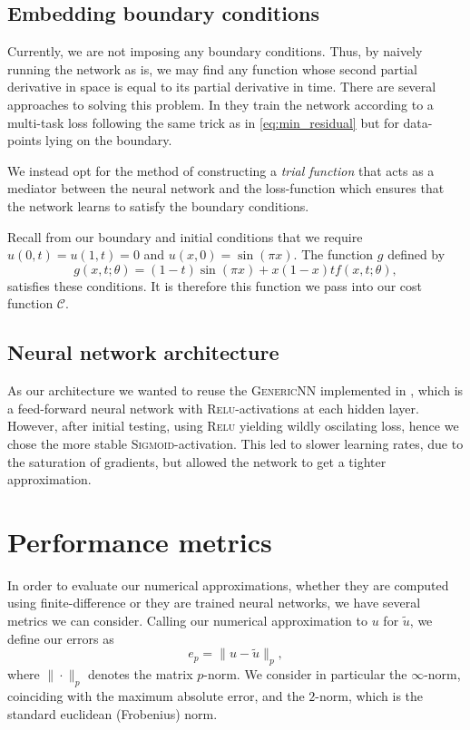 \documentclass[article, a4paper, oneside]{memoir}
\newcommand{\cost}{\mathcal{C}}
\begin{document}
	\subsection{Embedding boundary conditions}

	Currently, we are not imposing any boundary conditions. Thus, by
	naively running the network as is, we may find any function whose
	second partial derivative in space is equal to its partial derivative
	in time. There are several approaches to solving this problem. In
	\cite{luDeepXDEDeepLearning2019} they train the network according to a
	multi-task loss following the same trick as in \cref{eq:min_residual}
	but for data-points lying on the boundary.
	
	We instead opt for the method of constructing a \emph{trial function}
	that acts as a mediator between the neural network and the
	loss-function which ensures that the network learns to satisfy the
	boundary conditions.

	Recall from our boundary and initial conditions that we require \( u(0,
	t) = u(1, t) = 0 \) and \( u(x, 0) = \sin(\pi x) \). The function \( g
	\) defined by
	\begin{equation}
		\label{eq:trial}
		g(x, t; \theta) = (1 - t) \sin(\pi x) + x(1-x)t f(x, t; \theta),
	\end{equation}
	satisfies these conditions. It is therefore this function we pass into
	our cost function \( \cost \).
	
	\subsection{Neural network architecture}

	As our architecture we wanted to reuse the \textsc{GenericNN}
	implemented in \cite{stangebyFYSSTK4155Project2019a}, which is a
	feed-forward neural network with \textsc{Relu}-activations at each
	hidden layer. However, after initial testing, using \textsc{Relu}
	yielding wildly oscilating loss, hence we chose the more stable
	\textsc{Sigmoid}-activation. This led to slower learning rates, due to
	the saturation of gradients, but allowed the network to get a tighter
	approximation.
	
	\section{Performance metrics}
	
	In order to evaluate our numerical approximations, whether they are
	computed using finite-difference or they are trained neural networks,
	we have several metrics we can consider. Calling our numerical
	approximation to \( u \) for \( \tilde{u} \), we define our errors as
	\begin{equation}
		e_p = \| u - \tilde{u} \|_p,
	\end{equation}
	where \( \| \cdot \|_p \) denotes the matrix \(p\)-norm. We consider in
	particular the \( \infty\)-norm, coinciding with the maximum absolute
	error, and the \( 2 \)-norm, which is the standard euclidean
	(Frobenius) norm.
\end{document}
